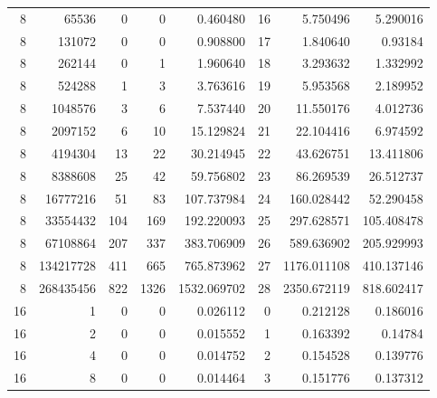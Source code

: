 \begin{longtable}[c]{@{}rrrrrrrr@{}}
    8         & 65536     & 0         & 0        & 0.460480    & 16                  & 5.750496    & 5.290016   \\
    8         & 131072    & 0         & 0        & 0.908800    & 17                  & 1.840640    & 0.93184    \\
    8         & 262144    & 0         & 1        & 1.960640    & 18                  & 3.293632    & 1.332992   \\
    8         & 524288    & 1         & 3        & 3.763616    & 19                  & 5.953568    & 2.189952   \\
    8         & 1048576   & 3         & 6        & 7.537440    & 20                  & 11.550176   & 4.012736   \\
    8         & 2097152   & 6         & 10       & 15.129824   & 21                  & 22.104416   & 6.974592   \\
    8         & 4194304   & 13        & 22       & 30.214945   & 22                  & 43.626751   & 13.411806  \\
    8         & 8388608   & 25        & 42       & 59.756802   & 23                  & 86.269539   & 26.512737  \\
    8         & 16777216  & 51        & 83       & 107.737984  & 24                  & 160.028442  & 52.290458  \\
    8         & 33554432  & 104       & 169      & 192.220093  & 25                  & 297.628571  & 105.408478 \\
    8         & 67108864  & 207       & 337      & 383.706909  & 26                  & 589.636902  & 205.929993 \\
    8         & 134217728 & 411       & 665      & 765.873962  & 27                  & 1176.011108 & 410.137146 \\
    8         & 268435456 & 822       & 1326     & 1532.069702 & 28                  & 2350.672119 & 818.602417 \\
    16        & 1         & 0         & 0        & 0.026112    & 0                   & 0.212128    & 0.186016   \\
    16        & 2         & 0         & 0        & 0.015552    & 1                   & 0.163392    & 0.14784    \\
    16        & 4         & 0         & 0        & 0.014752    & 2                   & 0.154528    & 0.139776   \\
    16        & 8         & 0         & 0        & 0.014464    & 3                   & 0.151776    & 0.137312   \\

\end{longtable}
